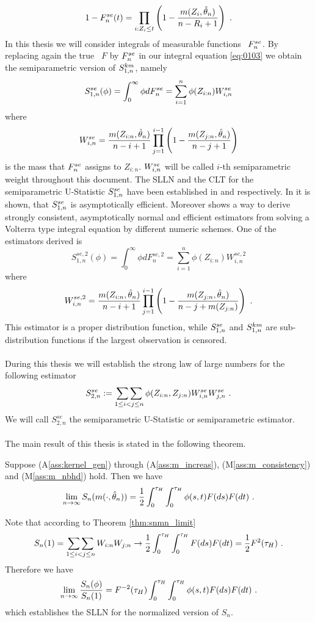 $$1-F_n^{se}(t) = \prod\limits_{i:Z_i\leq t}\left(1-\frac{m(Z_i,\hat{\theta}_n)}{n-R_i+1}\right)\textrm{ .}$$
In this thesis we will consider integrals of measurable functions \wrt\ $F_n^{se}$. By replacing again the true \df\ $F$ by $F_n^{se}$ in our integral equation \eqref{eq:0103} we obtain the semiparametric version of $S_{1,n}^{km}$, namely
$$S_{1,n}^{se}(\phi)=\int_0^\infty \phi dF_n^{se} = \sum\limits_{i=1}^n \phi(Z_{i:n})W_{i,n}^{se}$$
where 
$$W_{i,n}^{se} = \frac{m(Z_{i:n}, \hat{\theta}_n)}{n-i+1} \prod\limits_{j=1}^{i-1}\left(1-\frac{m(Z_{j:n}, \hat{\theta}_n)}{n-j+1}\right)$$
is the mass that $F_n^{se}$ assigns to $Z_{i:n}$. $W_{i,n}^{se}$ will be called $i$-th semiparametric weight throughout this document. The SLLN and the CLT for the semiparametric U-Statistic $S_{1,n}^{se}$ have been established in \citet{dikta2000strong} and \citet{dikta2005central} respectively. In \cite{dikta2014efficient} it is shown, that  $S_{1,n}^{se}$ is asymptotically efficient. Moreover \cite{dikta2016volterra} shows a way to derive strongly consistent, asymptotically normal and efficient estimators from solving a Volterra type integral equation by different numeric schemes.  One of the estimators derived is
$$S^{se,2}_{1,n}(\phi)=\int_0^\infty \phi dF^{se,2}_n = \sum\limits_{i=1}^n \phi(Z_{i:n})W^{se,2}_{i,n}$$
where 
$$W^{se,2}_{i,n} = \frac{m(Z_{i:n}, \hat{\theta}_n)}{n-i+1} \prod\limits_{j=1}^{i-1}\left(1-\frac{m(Z_{j:n}, \hat{\theta}_n)}{n-j+m(Z_{j:n})}\right)\textrm{ .}$$
This estimator is a proper distribution function, while $S_{1,n}^{se}$ and $S_{1,n}^{km}$ are sub-distribution functions if the largest observation is censored.
\\
\\
During this thesis we will establish the strong law of large numbers for the following estimator
$$S_{2,n}^{se} := \mathop{\sum\sum}\limits_{1\leq i<j\leq n}\phi(Z_{i:n}, Z_{j:n})W_{i,n}^{se}W_{j,n}^{se}\textrm{ .}$$
We will call $S_{2,n}^{se}$ the semiparametric U-Statistic or semiparametric estimator. \\
\\
The main result of this thesis is stated in the following theorem.
\begin{thm}
	Suppose (A\ref{ass:kernel_gen}) through (A\ref{ass:m_increas}), (M\ref{ass:m_consistency}) and (M\ref{ass:m_nbhd}) hold. Then we have
	$$\lim\limits_{n\to\infty} S_n(m(\cdot, \hat{\theta}_n)) = \frac{1}{2}\int_{0}^{\tau_H}\int_{0}^{\tau_H} \phi(s,t) F(ds)F(dt)\textrm{ .}$$
	\label{thm:snmn_limit}
\end{thm}
%
\begin{remark}
	Note that according to Theorem \ref{thm:snmn_limit} 
	\begin{equation*}
	S_n(1) = \mathop{\sum\sum}\limits_{1\leq i<j \leq n} W_{i:n} W_{j:n} \to  \frac{1}{2}\int_{0}^{\tau_H} \int_{0}^{\tau_H} F(ds)F(dt) = \frac{1}{2} F^{2}(\tau_H)\textrm{ .}
	\end{equation*}
	Therefore we have 
	\begin{equation*}
	\lim\limits_{n\to\infty}\frac{S_n(\phi)}{S_n(1)} = F^{-2}(\tau_H) \int_{0}^{\tau_H} \int_{0}^{\tau_H} \phi(s,t)F(ds)F(dt)\textrm{ .}
	\end{equation*}
	which establishes the SLLN for the normalized version of $S_n$.
\end{remark}
